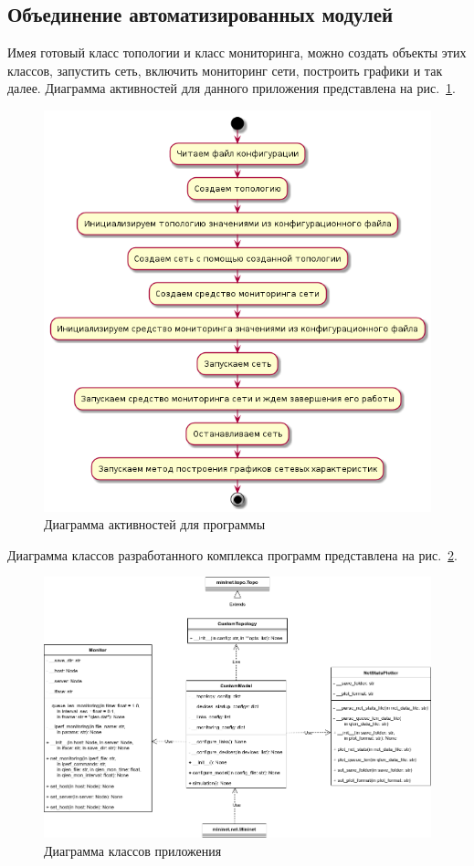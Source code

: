 \documentclass[60x84/16,8pt]{ittmm}
\begin{document}
\subsection{Объединение автоматизированных модулей}

Имея готовый класс топологии и класс мониторинга, можно создать объекты
этих классов, запустить сеть, включить мониторинг сети, построить
графики и так далее. Диаграмма активностей для данного приложения
представлена на рис.~\ref{fig:monitoring}.

\begin{figure}[!h]
  \centering
  \includegraphics[width=0.7\linewidth]{monitoring}
  \caption{Диаграмма активностей для программы}
  \label{fig:monitoring}
\end{figure}


Диаграмма классов разработанного комплекса программ представлена на
рис.~\ref{fig:classdia}.

\begin{figure}[!h]
  \centering
  \includegraphics[width=1.0\linewidth]{classdia}
  \caption{Диаграмма классов приложения}
  \label{fig:classdia}
\end{figure}
\end{document}
